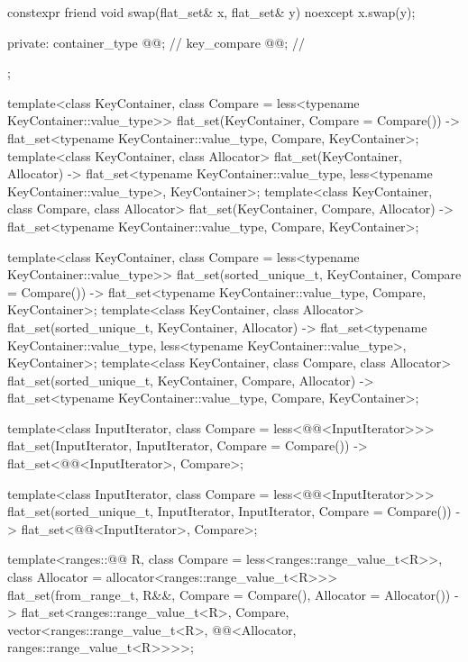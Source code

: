 \begin{codeblock}
{{    constexpr friend void swap(flat_set& x, flat_set& y) noexcept { x.swap(y); }

  private:
    container_type @@;           // \expos
    key_compare @@;        // \expos
  };

  template<class KeyContainer, class Compare = less<typename KeyContainer::value_type>>
    flat_set(KeyContainer, Compare = Compare())
      -> flat_set<typename KeyContainer::value_type, Compare, KeyContainer>;
  template<class KeyContainer, class Allocator>
    flat_set(KeyContainer, Allocator)
      -> flat_set<typename KeyContainer::value_type,
                  less<typename KeyContainer::value_type>, KeyContainer>;
  template<class KeyContainer, class Compare, class Allocator>
    flat_set(KeyContainer, Compare, Allocator)
      -> flat_set<typename KeyContainer::value_type, Compare, KeyContainer>;

  template<class KeyContainer, class Compare = less<typename KeyContainer::value_type>>
    flat_set(sorted_unique_t, KeyContainer, Compare = Compare())
      -> flat_set<typename KeyContainer::value_type, Compare, KeyContainer>;
  template<class KeyContainer, class Allocator>
    flat_set(sorted_unique_t, KeyContainer, Allocator)
      -> flat_set<typename KeyContainer::value_type,
                  less<typename KeyContainer::value_type>, KeyContainer>;
  template<class KeyContainer, class Compare, class Allocator>
    flat_set(sorted_unique_t, KeyContainer, Compare, Allocator)
      -> flat_set<typename KeyContainer::value_type, Compare, KeyContainer>;

  template<class InputIterator, class Compare = less<@@<InputIterator>>>
    flat_set(InputIterator, InputIterator, Compare = Compare())
      -> flat_set<@@<InputIterator>, Compare>;

  template<class InputIterator, class Compare = less<@@<InputIterator>>>
    flat_set(sorted_unique_t, InputIterator, InputIterator, Compare = Compare())
      -> flat_set<@@<InputIterator>, Compare>;

  template<ranges::@@ R, class Compare = less<ranges::range_value_t<R>>,
           class Allocator = allocator<ranges::range_value_t<R>>>
    flat_set(from_range_t, R&&, Compare = Compare(), Allocator = Allocator())
      -> flat_set<ranges::range_value_t<R>, Compare,
                  vector<ranges::range_value_t<R>,
                         @@<Allocator, ranges::range_value_t<R>>>>;

}
\end{codeblock}
